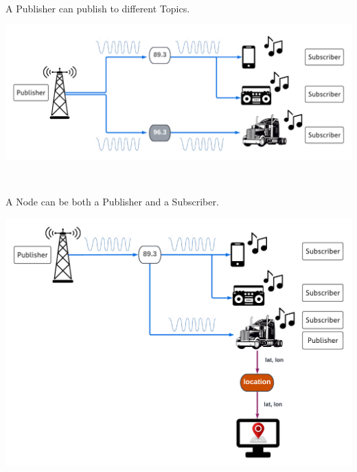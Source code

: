 \documentclass[usenames,11,dvipsnames,svgnames,x11names,aspectratio=1610,bibref]{beamer}
\newcommand{\mydisclaimer}{{\color{disclaimer}{\scriptsize ROS 2 -- Part I}}}
\renewcommand\sec{{\cnordSix{\secname}\hfill\mydisclaimer~} }
\begin{document}
\begin{frame}[fragile]{\sec}
\vspace*{\fill}
\begin{center} 
A Publisher can publish to different Topics.

\includegraphics[width=.8\linewidth]{figures/lecture2/analogy8.pdf}

\end{center}
\vspace*{\fill}
\end{frame}



\begin{frame}[fragile]{\sec}
\vspace*{\fill}
\begin{center} 
A Node can be both a Publisher and a Subscriber.

\includegraphics[width=.7\linewidth]{figures/lecture2/analogy9.pdf}

\end{center}
\vspace*{\fill}
\end{frame}


\end{document}
